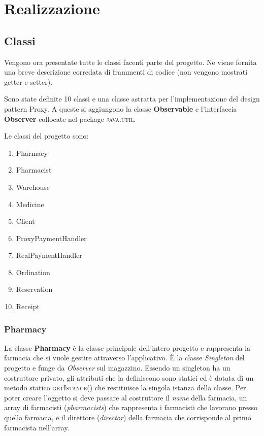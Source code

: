 \documentclass[a4paper, 10pt]{report}
\begin{document}
\chapter{Realizzazione}
\section{Classi}
Vengono ora presentate tutte le classi facenti parte del progetto. Ne viene fornita una breve descrizione corredata di frammenti di codice (non vengono mostrati getter e setter).

Sono state definite 10 classi e una classe astratta per l'implementazione del design pattern Proxy. A queste si aggiungono la classe \textbf{Observable} e l'interfaccia \textbf{Observer} collocate nel package \textsc{java.util}.

Le classi del progetto sono:
\begin{enumerate}
\item Pharmacy
\item Pharmacist
\item Warehouse
\item Medicine
\item Client
\item ProxyPaymentHandler
\item RealPaymentHandler
\item Ordination
\item Reservation
\item Receipt
\end{enumerate}
\subsection{Pharmacy}
La classe \textbf{Pharmacy} è la classe principale dell'intero progetto e rappresenta la farmacia che si vuole gestire attraverso l'applicativo. È la classe \textit{Singleton} del progetto e funge da \textit{Observer} sul magazzino. Essendo un singleton ha un costruttore privato, gli attributi che la definiscono sono statici ed è dotata di un metodo statico \textsc{getIstance()} che restituisce la singola istanza della classe. Per poter creare l'oggetto si deve passare al costruttore il \textit{name} della farmacia, un array di farmacisti (\textit{pharmacists}) che rappresenta i farmacisti che lavorano presso quella farmacia, e il direttore (\textit{director}) della farmacia che corrisponde al primo farmacista nell'array.
\end{document}
